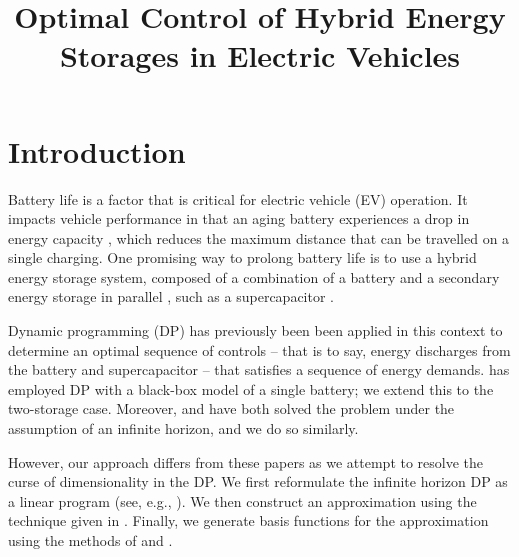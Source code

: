 \documentclass[conference]{IEEEtran}
\begin{document}
\title{Optimal Control of Hybrid Energy Storages in Electric Vehicles}

\author{
}


\maketitle


\section{Introduction}
Battery life is a factor that is critical for electric vehicle (EV) operation. It impacts vehicle performance in that an aging battery experiences a drop in energy capacity \cite{shi2017optimal}, which reduces the maximum distance that can be travelled on a single charging. One promising way to prolong battery life is to use a hybrid energy storage system, composed of a combination of a battery and a secondary energy storage in parallel \cite{thounthong2009energy}, such as a supercapacitor \cite{bambang2014energy}\cite{thounthong2009energy}\cite{7939849}. 

Dynamic programming (DP) has previously been been applied in this context to determine an optimal sequence of controls -- that is to say, energy discharges from the battery and supercapacitor -- that satisfies a sequence of energy demands. \cite{su2013modeling} has employed DP with a black-box model of a single battery; we extend this to the two-storage case. Moreover, \cite{8330176} and \cite{8315074} have both solved the problem under the assumption of an infinite horizon, and we do so similarly.

However, our approach differs from these papers as we attempt to resolve the curse of dimensionality in the DP. We first reformulate the infinite horizon DP as a linear program (see, e.g., \cite{Bertsekas:2007:DPO:1396348}). We then construct an approximation using the technique given in \cite{deFarias:2003:LPA:970869.970918}. Finally, we generate basis functions for the approximation using the methods of \cite{Bellman:1957} and \cite{Bellman1962}. %
\end{document}
